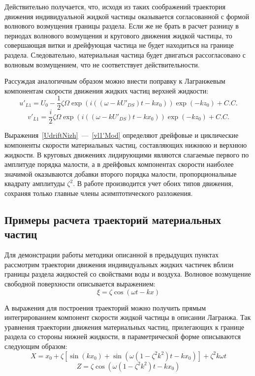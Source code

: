 Действительно получается, что, исходя из таких соображений траектория движения индивидуальной жидкой частицы оказывается согласованной с формой волнового возмущения границы раздела. Если же не брать в расчет разницу в периодах волнового возмущения и кругового движения жидкой частицы, то совершающая витки и дрейфующая частица не будет находиться на границе раздела. Следовательно, материальная частица будет двигаться рассогласовано с волновым возмущением, что не соответствует действительности.

Рассуждая аналогичным образом можно внести поправку к Лагранжевым компонентам скорости движения жидких частиц верхней жидкости:
\begin{equation}
u'_{L1}=U_{0}-\dfrac{1}{2}\zeta \Omega \exp \left( i\left( \left( \omega-k U'_{DS}\right) t- k x_{0}\right) \right) \exp \left(-k z_{0} \right) +C.C.
\label{ul1'Mod}
\end{equation}
\begin{equation}
v'_{L1}=\dfrac{i}{2}\zeta \Omega \exp \left( i\left( \left( \omega-k U'_{DS}\right) t- k x_{0}\right) \right) \exp \left(- k z_{0} \right) +C.C.
\label{vl1'Mod}
\end{equation}	

Выражения~\eqref{UdriftNizh}~---~\eqref{vl1'Mod} определяют дрейфовые и циклические компоненты скорости материальных частиц, составляющих нижнюю и верхнюю жидкости. В круговых движениях лидирующими являются слагаемые первого по амплитуде порядка малости, а в дрейфовых компонентах скорости наиболее значимой оказываются добавки второго порядка малости, пропорциональные квадрату амплитуды $ \zeta^{2} $. В работе производится учет обоих типов движения, сохраняя только главные члены асимптотического разложения.


\newpage
\subsection{Примеры расчета траекторий материальных частиц}

Для демонстрации работы методики описанной в предыдущих пунктах рассмотрим траектории движения индивидуальных жидких частичек вблизи границы раздела жидкостей со свойствами воды и воздуха. Волновое возмущение свободной поверхности описывается выражением:
\begin{equation*}
\xi=\zeta \cos \left( \omega t - k x \right)
\end{equation*}

А выражения для построения траекторий можно получить прямым интегрированием компонент скорости жидкой частицы в описании Лагранжа. Так уравнения траектории движения материальных частиц, прилегающих к границе раздела со стороны нижней жидкости, в параметрической форме описываются следующим образом:
\begin{equation}
X=x_{0}+\zeta \left[ \sin \left( k x_{0}\right) + \sin \left( \omega \left( 1-\zeta^{2} k^{2}\right) t- k x_{0}\right) \right]+\zeta^{2} k \omega t
\label{X}
\end{equation}
\begin{equation}
Z=\zeta  \cos \left( \omega \left( 1-\zeta^{2} k^{2}\right) t- k x_{0}\right)
\label{Z}
\end{equation}

